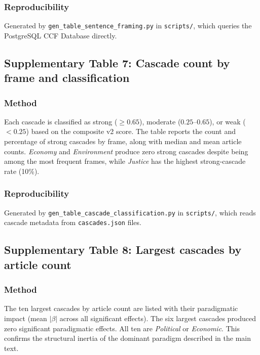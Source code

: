 \subsubsection*{Reproducibility}
Generated by \texttt{gen\_table\_sentence\_framing.py} in \texttt{scripts/},
which queries the PostgreSQL CCF Database directly.


\newpage
\subsection*{Supplementary Table 7: Cascade count by frame and classification}



\subsubsection*{Method}
Each cascade is classified as strong ($\geq 0.65$), moderate ($0.25$--$0.65$), or weak ($< 0.25$) based on the composite v2 score. The table reports the count and percentage of strong cascades by frame, along with median and mean article counts. \emph{Economy} and \emph{Environment} produce zero strong cascades despite being among the most frequent frames, while \emph{Justice} has the highest strong-cascade rate (10\%).

\subsubsection*{Reproducibility}
Generated by \texttt{gen\_table\_cascade\_classification.py} in \texttt{scripts/},
which reads cascade metadata from \texttt{cascades.json} files.


\newpage
\subsection*{Supplementary Table 8: Largest cascades by article count}



\subsubsection*{Method}
The ten largest cascades by article count are listed with their paradigmatic impact (mean $|\beta|$ across all significant effects). The six largest cascades produced zero significant paradigmatic effects. All ten are \emph{Political} or \emph{Economic}. This confirms the structural inertia of the dominant paradigm described in the main text.

